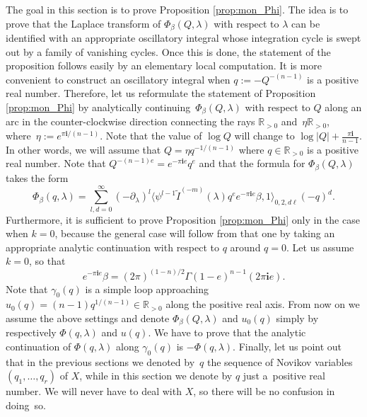 \documentclass[pdftex]{sigma}
\numberwithin{equation}{section}
\newcommand{\RR}{\mathbb{R}}
\newcommand{\ii}{\mathbf{i}}
\begin{document}
The goal in this section is to prove Proposition
\ref{prop:mon_Phi}. The idea is to prove that the Laplace transform of
$\Phi_\beta(Q,\lambda)$ with respect to $\lambda$ can be identified
with an appropriate oscillatory integral whose integration cycle is
swept out by a family of vanishing cycles. Once this is done, the
statement of the proposition follows easily by an elementary local
computation. It is more convenient to construct an oscillatory integral when $q:=-Q^{-(n-1)}$ is a positive real number. Therefore, let us reformulate the statement of Proposition \ref{prop:mon_Phi} by analytically continuing~$\Phi_\beta(Q,\lambda)$ with respect to $Q$ along an arc in the counter-clockwise direction connecting the rays $\RR_{>0}$ and~$\eta \RR_{>0}$, where~$\eta:=e^{\pi\ii/(n-1)}$. Note that the value of $\log Q$ will change to $\log |Q| + \tfrac{\pi\ii}{n-1}$. In other words, we will assume that $Q= \eta q^{-1/(n-1)}$ where $q\in \RR_{>0}$ is a positive real number. Note that $Q^{-(n-1) e}= e^{-\pi\ii e} q^{e}$ and that the formula for $\Phi_\beta(Q,\lambda)$ takes the form
\begin{equation}\label{phi_infty}
\Phi_\beta(q,\lambda)=
\sum_{l,d=0}^\infty
(-\partial_\lambda)^l
\big\langle \psi^{l-1}
\widetilde{I}^{(-m)}(\lambda) q^{e} e^{-\pi\ii e}\beta, 1\big\rangle_{0,2,d\ell} (-q)^d.
\end{equation}
Furthermore, it is sufficient to prove Proposition \ref{prop:mon_Phi} only in the case when $k=0$, because the general case will follow from that one by taking an appropriate analytic continuation with respect to $q$ around $q=0$. Let us assume $k=0$, so that
\[
e^{-\pi\ii e}\beta=
(2\pi)^{(1-n)/2}
\Gamma(1-e)^{n-1}
(2\pi\ii e).
\]
Note that $\gamma_0(q)$ is a simple loop approaching
$u_0(q)=(n-1)q^{1/(n-1)}\in \RR_{>0}$ along the positive real
axis. From now on we assume the above settings and denote
$\Phi_\beta(Q,\lambda)$ and $u_0(q)$ simply by respectively
$\Phi(q,\lambda)$ and $u(q)$. We have to prove that the analytic continuation of $\Phi(q,\lambda)$ along $\gamma_0(q)$ is $-\Phi(q,\lambda)$. Finally, let us point out that in the previous sections we denoted by~$q$ the sequence of Novikov variables $(q_1,\dots,q_r)$ of $X$, while in this section we denote by $q$ just a~positive real number. We will never have to deal with $X$, so there will be no confusion in doing~so.
\end{document}
